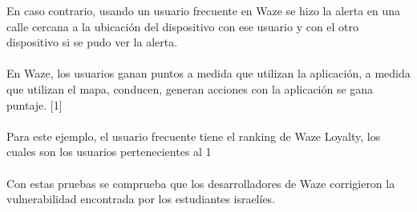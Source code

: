En caso contrario, usando un usuario frecuente en Waze se hizo la alerta en una calle cercana a la ubicación del dispositivo con ese usuario y con el otro dispositivo si se pudo ver la alerta.
\\\\
En Waze, los usuarios ganan puntos a medida que utilizan la aplicación, a medida que utilizan el mapa, conducen, generan acciones con la aplicación se gana puntaje. [1]
\\\\
Para este ejemplo, el usuario frecuente tiene el ranking de Waze Loyalty, los cuales son los usuarios pertenecientes al 1%
\\\\
Con estas pruebas se comprueba que los desarrolladores de Waze corrigieron la vulnerabilidad encontrada por los estudiantes israelíes.